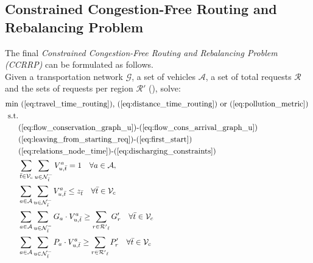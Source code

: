 \subsection{Constrained Congestion-Free Routing and Rebalancing Problem}
The final \textit{Constrained Congestion-Free Routing and Rebalancing Problem (CCRRP)} can be formulated as follows. \\
Given a transportation network $\mathcal{G}$, a set of vehicles $\mathcal{A}$, a set of total requests $\mathcal{R}$ and the sets of requests per region $\mathcal{R}'$ (), solve: \\

\begin{align}
	\text{min}&  \text{
		(\ref{eq:travel_time_routing}), (\ref{eq:distance_time_routing}) or (\ref{eq:pollution_metric})
	}\nonumber\\
	\text{s.t.} &\nonumber\\
	&\text{(\ref{eq:flow_conservation_graph_u})-(\ref{eq:flow_cons_arrival_graph_u})}\nonumber\\
	&\text{(\ref{eq:leaving_from_starting_req})-(\ref{eq:first_start})	}\nonumber\\
	&\text{(\ref{eq:relations_node_time})-(\ref{eq:discharging_constraints})}\nonumber\\
	&\sum_{\bar{t} \in \mathcal{V}_c}\sum_{ u \in \mathcal{N}^-_{\bar{t}} }V^a_{u, \bar{t}} = 1 \quad \forall a \in \mathcal{A},  \label{eq:each_vehicle_end2}\\
	&\sum_{a \in \mathcal{A}}\sum_{u \in \mathcal{N}^-_{\bar{t}} } V^a_{u, \bar{t}} \leq z_{\bar{t}} \quad \forall \bar{t} \in \mathcal{V}_c \label{eq:capacity_depot_respected2}\\
	&\sum_{a \in \mathcal{A}}\sum_{u \in \mathcal{N}^-_{\bar{t}} } G_a \cdot V^a_{u, \bar{t}} \ge \sum_{r \in \mathcal{R'}_{\bar{t}}} G'_r \quad \forall \bar{t} \in \mathcal{V}_c \label{eq:goods_cap2}\\
	&\sum_{a \in \mathcal{A}}\sum_{u \in \mathcal{N}^-_{\bar{t}} } P_a \cdot V^a_{u, \bar{t}} \ge \sum_{r \in \mathcal{R'}_{\bar{t}}} P'_r \quad \forall \bar{t} \in \mathcal{V}_c \label{eq:people_cap2}\\
\end{align}
